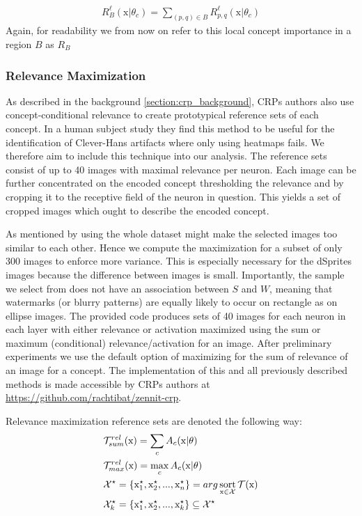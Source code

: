 \begin{align}\label{eq:local_importance}
    R_{B}^{\ell}(\mathrm{x} | \theta_c) = \sum_{(p,q) \in B} R_{p,q}^{\ell}(\mathrm{x} | \theta_c)
\end{align}
Again, for readability we from now on refer to this local concept importance in a region $B$ as $R_B$

\subsubsection{Relevance Maximization}
As described in the background \cref{section:crp_background}, CRPs authors also use concept-conditional relevance to create prototypical reference sets of each concept. In a human subject study \cite{Achtibat2023} they find this method to be useful for the identification of Clever-Hans artifacts where only using heatmaps fails. We therefore aim to include this technique into our analysis. The reference sets consist of up to 40 images with maximal relevance per neuron. Each image can be further concentrated on the encoded concept thresholding the relevance and by cropping it to the receptive field of the neuron in question. This yields a set of cropped images which ought to describe the encoded concept. 

As mentioned by \cite{Achtibat2022} using the whole dataset might make the selected images too similar to each other. Hence we compute the maximization for a subset of only 300 images to enforce more variance. This is especially necessary for the dSprites images because the difference between images is small.  Importantly, the sample we select from does not have an association between $S$ and $W$, meaning that watermarks (or blurry patterns) are equally likely to occur on rectangle as on ellipse images. 
The provided code produces sets of 40 images for each neuron in each layer with either relevance or activation maximized using the sum or maximum (conditional) relevance/activation for an image. After preliminary experiments we use the default option of maximizing for the sum of relevance of an image for a concept. 
The implementation of this and all previously described methods is made accessible by CRPs authors at
\url{https://github.com/rachtibat/zennit-crp}. 

Relevance maximization reference sets are denoted the following way:
 \begin{align}
& \mathcal{T}_{sum}^{rel} (\mathrm{x}) = \sum_{c} A_c(\mathrm{x}|\theta) \\
& \mathcal{T}_{max}^{rel} (\mathrm{x}) = \max_{c} A_c(\mathrm{x}|\theta) \\
&\mathcal{X}^{\star} = \{ \mathrm{x}_{1}^{\star},\mathrm{x}_{2}^{\star},..., \mathrm{x}_{n}^{\star} \} = arg \operatorname*{sort}_{\mathrm{x} \in \mathcal{X}} \mathcal{T}(\mathrm{x}) \\
& \mathcal{X}_{k}^{\star} = \{ \mathrm{x}_{1}^{\star},\mathrm{x}_{2}^{\star},..., \mathrm{x}_{k}^{\star} \} \subseteq \mathcal{X}^{\star}
 \end{align}